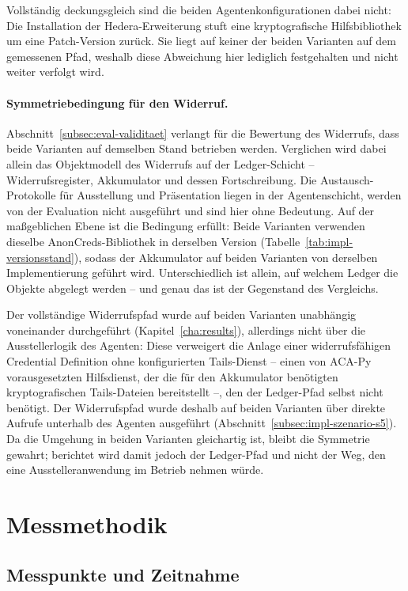 Vollständig deckungsgleich sind die beiden Agentenkonfigurationen dabei nicht: Die Installation der Hedera-Erweiterung stuft eine kryptografische Hilfsbibliothek um eine Patch-Version zurück. Sie liegt auf keiner der beiden Varianten auf dem gemessenen Pfad, weshalb diese Abweichung hier lediglich festgehalten und nicht weiter verfolgt wird.

\paragraph{Symmetriebedingung für den Widerruf.} Abschnitt~\ref{subsec:eval-validitaet} verlangt für die Bewertung des Widerrufs, dass beide Varianten auf demselben Stand betrieben werden. Verglichen wird dabei allein das Objektmodell des Widerrufs auf der Ledger-Schicht -- Widerrufsregister, Akkumulator und dessen Fortschreibung. Die Austausch-Protokolle für Ausstellung und Präsentation liegen in der Agentenschicht, werden von der Evaluation nicht ausgeführt und sind hier ohne Bedeutung. Auf der maßgeblichen Ebene ist die Bedingung erfüllt: Beide Varianten verwenden dieselbe AnonCreds-Bibliothek in derselben Version (Tabelle~\ref{tab:impl-versionsstand}), sodass der Akkumulator auf beiden Varianten von derselben Implementierung geführt wird. Unterschiedlich ist allein, auf welchem Ledger die Objekte abgelegt werden -- und genau das ist der Gegenstand des Vergleichs.

Der vollständige Widerrufspfad wurde auf beiden Varianten unabhängig voneinander durchgeführt (Kapitel~\ref{cha:results}), allerdings nicht über die Ausstellerlogik des Agenten: Diese verweigert die Anlage einer widerrufsfähigen Credential Definition ohne konfigurierten Tails-Dienst -- einen von ACA-Py vorausgesetzten Hilfsdienst, der die für den Akkumulator benötigten kryptografischen Tails-Dateien bereitstellt --, den der Ledger-Pfad selbst nicht benötigt. Der Widerrufspfad wurde deshalb auf beiden Varianten über direkte Aufrufe unterhalb des Agenten ausgeführt (Abschnitt~\ref{subsec:impl-szenario-s5}). Da die Umgehung in beiden Varianten gleichartig ist, bleibt die Symmetrie gewahrt; berichtet wird damit jedoch der Ledger-Pfad und nicht der Weg, den eine Ausstelleranwendung im Betrieb nehmen würde.


\section{Messmethodik}
\label{sec:impl-messmethodik}

\subsection{Messpunkte und Zeitnahme}
\label{subsec:impl-messpunkte}


